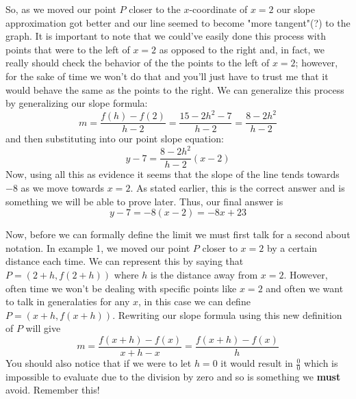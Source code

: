 \documentclass[addpoints]{exam}
\begin{document}
\begin{questions}
\begin{minipage}{0.31\linewidth}
      \end{minipage}
      \vspace{0.1in}
      \newline
      So, as we moved our point $P$ closer to the $x$-coordinate of $x=2$ our slope approximation got better and our line seemed to become "more tangent"(?) to the graph. It is important to note that we could've easily done this process with points that were to the left of $x=2$ as opposed to the right and, in fact, we really should check the behavior of the the points to the left of $x=2$; however, for the sake of time we won't do that and you'll just have to trust me that it would behave the same as the points to the right. We can generalize this process by generalizing our slope formula: 
      \[
        m = \frac{f(h)-f(2)}{h-2} = \frac{15-2h^2 - 7}{h-2} = \frac{8-2h^2}{h-2}
      \]
      and then substituting into our point slope equation: 
      \[
        y-7=\frac{8-2h^2}{h-2}\left(x-2\right)
      \]
      Now, using all this as evidence it seems that the slope of the line tends towards $-8$ as we move towards $x=2$. As stated earlier, this is the correct answer and is something we will be able to prove later. Thus, our final answer is 
      \[
        \boxed{y-7=-8(x-2)=-8x+23}
      \]
    \fi
  \end{questions}
  \newpage 
  \noindent Now, before we can formally define the limit we must first talk for a second about notation. In example 1, we moved our point $P$ closer to $x=2$ by a certain distance each time. We can represent this by saying that $P=(2+h, f(2+h))$ where $h$ is the distance away from $x=2$. However, often time we won't be dealing with specific points like $x=2$ and often we want to talk in generalaties for any $x$, in this case we can define $P=(x+h, f(x+h))$. Rewriting our slope formula using this new definition of $P$ will give 
    \[
      m = \frac{f(x+h)-f(x)}{x+h-x} = \frac{f(x+h)-f(x)}{h}
    \]
  You should also notice that if we were to let $h=0$ it would result in $\frac{0}{0}$ which is impossible to evaluate due to the division by zero and so is something we \textbf{must} avoid. Remember this!
\end{document}

